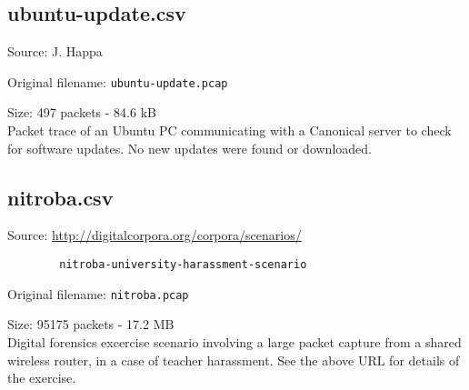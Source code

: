 \documentclass[12pt,a4paper]{article}
\newcommand{\dbl}{\\[\baselineskip]}
\begin{document}
        \subsection{ubuntu-update.csv}
            Source: J. Happa

            Original filename: \verb|ubuntu-update.pcap|

            Size: 497 packets - 84.6 kB\dbl
            Packet trace of an Ubuntu PC communicating with a Canonical
            server to check for software updates. No new updates were
            found or downloaded.

        \subsection{nitroba.csv}
            Source: \url{http://digitalcorpora.org/corpora/scenarios/}

            \verb!        nitroba-university-harassment-scenario!

            Original filename: \verb|nitroba.pcap|

            Size: 95175 packets - 17.2 MB\dbl
            Digital forensics excercise scenario involving a large
            packet capture from a shared wireless router, in a case of
            teacher harassment. See the above URL for details of the
            exercise.
\end{document}
